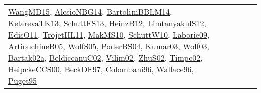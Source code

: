 {\begin{longtable}{lp{3cm}>{\raggedright}p{6cm}>{\raggedright}p{6cm}p{8cm}}
\href{articles/WangMD15.pdf}{WangMD15}\cite{WangMD15}, \href{papers/AlesioNBG14.pdf}{AlesioNBG14}\cite{AlesioNBG14}, \href{papers/BartoliniBBLM14.pdf}{BartoliniBBLM14}\cite{BartoliniBBLM14}, \href{papers/KelarevaTK13.pdf}{KelarevaTK13}\cite{KelarevaTK13}, \href{papers/SchuttFS13.pdf}{SchuttFS13}\cite{SchuttFS13}, \href{papers/HeinzB12.pdf}{HeinzB12}\cite{HeinzB12}, \href{articles/LimtanyakulS12.pdf}{LimtanyakulS12}\cite{LimtanyakulS12}, \href{papers/EdisO11.pdf}{EdisO11}\cite{EdisO11}, \href{articles/TrojetHL11.pdf}{TrojetHL11}\cite{TrojetHL11}, \href{papers/MakMS10.pdf}{MakMS10}\cite{MakMS10}, \href{papers/SchuttW10.pdf}{SchuttW10}\cite{SchuttW10}, \href{papers/Laborie09.pdf}{Laborie09}\cite{Laborie09}, \href{papers/ArtiouchineB05.pdf}{ArtiouchineB05}\cite{ArtiouchineB05}, \href{papers/WolfS05.pdf}{WolfS05}\cite{WolfS05}, \href{articles/PoderBS04.pdf}{PoderBS04}\cite{PoderBS04}, \href{papers/Kumar03.pdf}{Kumar03}\cite{Kumar03}, \href{papers/Wolf03.pdf}{Wolf03}\cite{Wolf03}, \href{papers/Bartak02a.pdf}{Bartak02a}\cite{Bartak02a}, \href{papers/BeldiceanuC02.pdf}{BeldiceanuC02}\cite{BeldiceanuC02}, \href{papers/Vilim02.pdf}{Vilim02}\cite{Vilim02}, \href{papers/ZhuS02.pdf}{ZhuS02}\cite{ZhuS02}, \href{articles/Timpe02.pdf}{Timpe02}\cite{Timpe02}, \href{articles/HeipckeCCS00.pdf}{HeipckeCCS00}\cite{HeipckeCCS00}, \href{papers/BeckDF97.pdf}{BeckDF97}\cite{BeckDF97}, \href{papers/Colombani96.pdf}{Colombani96}\cite{Colombani96}, \href{articles/Wallace96.pdf}{Wallace96}\cite{Wallace96}, \href{papers/Puget95.pdf}{Puget95}\cite{Puget95}\\

\end{longtable}}
